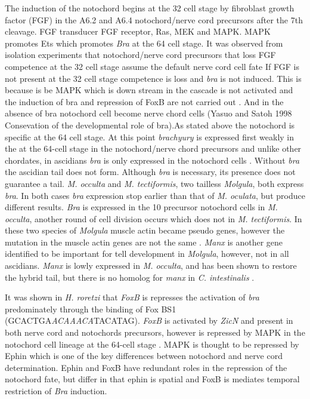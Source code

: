The induction of the notochord begins at the 32 cell stage by fibroblast growth factor (FGF) in the A6.2 and A6.4 notochord/nerve cord precursors\cite{satoh_ascidian_2001} after the 7th cleavage. FGF transducer FGF receptor, Ras, MEK and MAPK. MAPK promotes Ets which promotes \textit{Bra} at the 64 cell stage. It was observed from isolation experiments that notochord/nerve cord precursors that loss FGF competence at the 32 cell stage assume the default nerve cord cell fate \cite{minokawa_binary_2001}If FGF is not present at the 32 cell stage competence is loss and \textit{bra} is not induced. This is because is be MAPK which is down stream in the cascade is not activated and the induction of bra and repression of FoxB are not carried out \cite{hashimoto_transcription_2011}. And in the absence of bra notochord cell become nerve chord cells (Yasuo and Satoh 1998 Consevation of the developmental role of bra).As stated above the notochord is specific at the 64 cell stage. At this point \textit{brachyury} is expressed first weakly in the at the 64-cell stage in the notochord/nerve chord precursors \cite{yasuo_ascidian_1994} and unlike other chordates, in ascidians \textit{bra} is only expressed in the notochord cells \cite{yasuo_function_1993,corbo_characterization_1997,hotta_temporal_1999,takada_brachyury_2002}. Without \textit{bra} the ascidian tail does not form. Although \textit{bra} is necessary, its presence does not guarantee a tail. \textit{M. occulta} and \textit{M. tectiformis}, two tailless \textit{Molgula}, both express \textit{bra}. In both cases \textit{bra} expression stop earlier than that of \textit{M. oculata}, but produce different results. \textit{Bra} is expressed in the 10 precursor notochord cells in \textit{M. occulta}, another round of cell division occurs which does not in \textit{M. tectiformis}.  In these two species of \textit{Molgula} muscle actin became pseudo genes, however the mutation in the muscle actin genes are not the same \cite{swalla_novel_1993,jeffery_evolution_1999}. \textit{Manx} is another gene identified to be important for tell development in \textit{Molgula}, however, not in all ascidians. \textit{Manx} is lowly expressed in \textit{M. occulta}, and has been shown to restore the hybrid tail, but there is no homolog for \textit{manx} in \textit{C. intestinalis} \cite{swalla_requirement_1996,swalla_multigene_1999}. 
 
It was shown in \textit{H. roretzi} that \textit{FoxB} is represses the activation of \textit{bra} predominately through the binding of Fox BS1 (GCACTGA\textit{ACAAACA}TACATAG). \textit{FoxB} is activated by \textit{ZicN} and present in both nerve cord and notochords precursors, however is repressed by MAPK in the notochord cell lineage at the 64-cell stage \cite{hashimoto_transcription_2011}. MAPK is thought to be repressed by Ephin which is one of the key differences between notochord and nerve cord determination. Ephin and FoxB have redundant roles in the repression of the notochord fate, but differ in that ephin is spatial and FoxB is mediates temporal restriction of \textit{Bra} induction.
   
